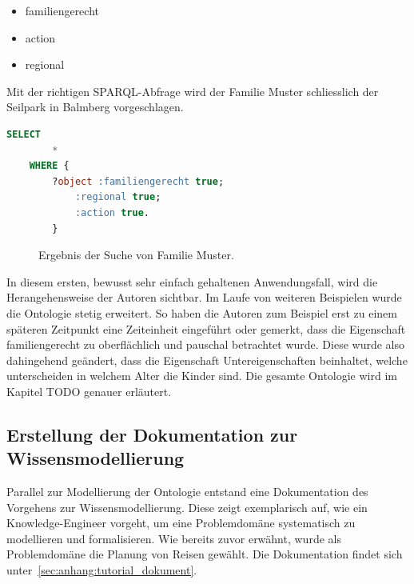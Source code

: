 \begin{itemize}
		\item familiengerecht
		\item action
		\item regional
\end{itemize}

Mit der richtigen SPARQL-Abfrage wird der Familie Muster schliesslich der Seilpark in Balmberg vorgeschlagen.

\begin{lstlisting}[caption={SPARQL-Abfrage um familiengerechte, regionale und actionreiche Ausflüge zu finden.},captionpos=b,language=SQL]
    SELECT
        *
    WHERE {
        ?object :familiengerecht true;
            :regional true;
            :action true.
        }
\end{lstlisting}


\begin{figure}[H]
\centering {}
\caption{Ergebnis der Suche von Familie Muster.\label{fig:famMusterOutput}\protect\footnotemark}
\end{figure}

In diesem ersten, bewusst sehr einfach gehaltenen Anwendungsfall, wird die Herangehensweise der Autoren sichtbar. Im Laufe von weiteren Beispielen wurde die Ontologie stetig erweitert. So haben die Autoren zum Beispiel erst zu einem späteren Zeitpunkt eine Zeiteinheit eingeführt oder gemerkt, dass die Eigenschaft familiengerecht zu oberflächlich und pauschal betrachtet wurde. Diese wurde also dahingehend geändert, dass die Eigenschaft Untereigenschaften beinhaltet, welche unterscheiden in welchem Alter die Kinder sind. Die gesamte Ontologie wird im Kapitel {\color{red} TODO} genauer erläutert.

\subsection{Erstellung der Dokumentation zur Wissensmodellierung}
\label{subsec:dokumentation_wissensmodellierung}
Parallel zur Modellierung der Ontologie entstand eine Dokumentation des Vorgehens zur Wissensmodellierung. Diese zeigt exemplarisch auf, wie ein Knowledge-Engineer vorgeht, um eine Problemdomäne systematisch zu modellieren und formalisieren. Wie bereits zuvor erwähnt, wurde als Problemdomäne die Planung von Reisen gewählt. Die Dokumentation findet sich unter~\autoref{sec:anhang:tutorial_dokument}.

